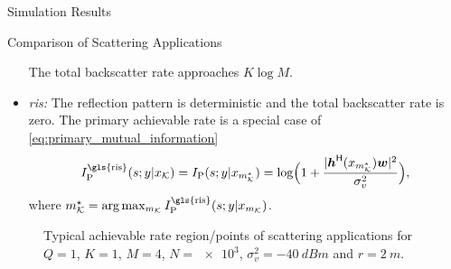 \documentclass[journal]{IEEEtran}
\begin{document}
\begin{section}{Simulation Results}
\begin{subsection}{Comparison of Scattering Applications}
\begin{itemize}
			The total backscatter rate approaches $K \log M$.
			\item \emph{\gls{ris}:} The reflection pattern is deterministic and the total backscatter rate is zero.
			The primary achievable rate is a special case of \eqref{eq:primary_mutual_information}
			\begin{equation}
				I_{\text{P}}^{\text{\gls{ris}}}(s;y|x_{\mathcal{K}}) = I_{\text{P}}(s;y|x_{m_{\mathcal{K}}^{\star}}) = \log \Bigl(1 + \frac{\lvert \boldsymbol{h}^\mathsf{H}(x_{m_{\mathcal{K}}^{\star}}) \boldsymbol{w} \rvert^2}{\sigma_v^2}\Bigr),
			\end{equation}
			where $m_{\mathcal{K}}^{\star} = \arg \max_{m_{\mathcal{K}}} I_{\text{P}}^{\text{\gls{ris}}}(s;y|x_{m_{\mathcal{K}}})$.
		\end{itemize}
		\begin{figure}[!t]
			\centering
			\resizebox{0.65\columnwidth}{!}{
				
			}
			\caption{Typical achievable rate region/points of scattering applications for $Q=1$, $K=1$, $M=4$, $N=\num{e3}$, $\sigma_v^2=\qty{-40}{dBm}$ and $r=\qty{2}{m}$.}
			\label{fg:region_comparison}
		\end{figure}


\end{subsection}
\end{section}
\end{document}
